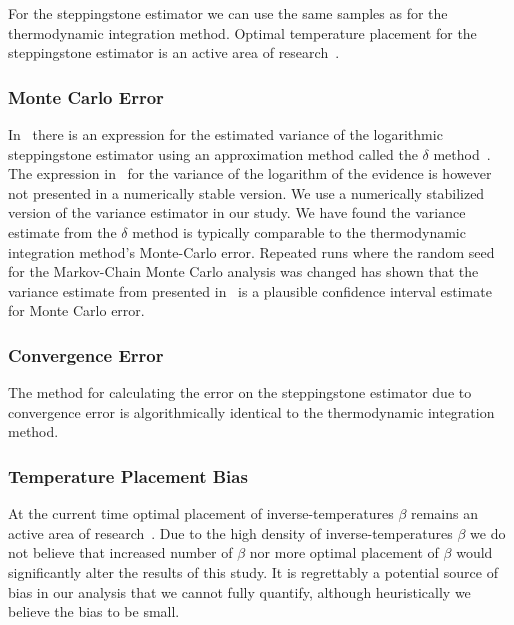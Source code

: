 For the steppingstone estimator we can use the same samples as for the thermodynamic integration method. Optimal temperature placement for the steppingstone estimator is an active area of research~\citep{annis2019thermodynamic}.
\subsubsection{Monte Carlo Error}
In~\cite{xie2010improving} there is an expression for the estimated variance of the logarithmic steppingstone estimator using an approximation method called the $\delta$ method~\citep{oehlert1992note}. The expression in~\cite{xie2010improving} for the variance of the logarithm of the evidence is however not presented in a numerically stable version. We use a numerically stabilized version of the variance estimator in our study. We have found the variance estimate from the $\delta$ method is typically comparable to the thermodynamic integration method's Monte-Carlo error. Repeated runs where the random seed for the Markov-Chain Monte Carlo analysis was changed has shown that the variance estimate from presented in~\cite{xie2010improving} is a plausible confidence interval estimate for Monte Carlo error.  

\subsubsection{Convergence Error}
The method for calculating the error on the steppingstone estimator due to convergence error is algorithmically identical to the thermodynamic integration method.

\subsubsection{Temperature Placement Bias}
At the current time optimal placement of inverse-temperatures $\beta$ remains an active area of research~\citep{annis2019thermodynamic}. Due to the high density of inverse-temperatures $\beta$ we do not believe that increased number of $\beta$ nor more optimal placement of $\beta$ would significantly alter the results of this study. It is regrettably a potential source of bias in our analysis that we cannot fully quantify, although heuristically we believe the bias to be small.

